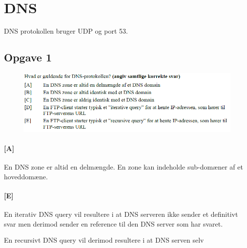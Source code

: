 \section{DNS}
DNS protokollen bruger UDP og port 53.

\subsection{Opgave 1}
\begin{figure}[H]
	\centering
	\includegraphics[width=\linewidth]{figs/dns/SE15OP2}
\end{figure}

\paragraph{[A]}
En DNS zone er altid en delmængde. En zone kan indeholde sub-domæner af et hoveddomæne.

\paragraph{[E]}
En iterativ DNS query vil resultere i at DNS serveren ikke sender et definitivt svar men derimod sender en reference til den DNS server som har svaret.

En recursivt DNS query vil derimod resultere i at DNS serven selv 
